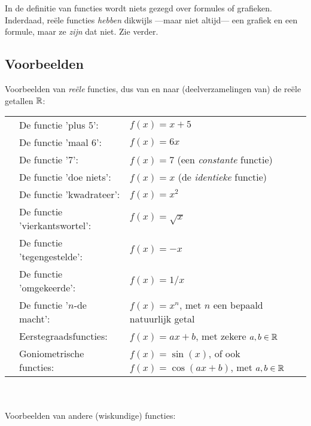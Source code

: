 \documentclass{ximera}
\begin{document}
 In de definitie van functies wordt niets gezegd over formules of grafieken. Inderdaad, reële functies \textit{hebben} dikwijls ---maar niet altijd--- een grafiek en een formule, maar ze \textit{zijn} dat niet. Zie verder.
 
 
\subsection{Voorbeelden}

Voorbeelden van \textit{reële} functies, dus van en naar (deelverzamelingen van) de reële getallen $\mathbb{R}$:
\\
\begin{tabular}[t]{l l l}
    & De functie 'plus $5$':       & $f(x) = x + 5$ \\
    & De functie 'maal 6':         & $f(x) = 6x$ \\
    & De functie '7':              & $f(x) = 7$  (een \textit{constante} functie) \\
    & De functie 'doe niets':      & $f(x) = x$  (de \textit{identieke} functie) \\
    & De functie 'kwadrateer':     & $f(x) = x^2$ \\
    & De functie 'vierkantswortel':& $f(x) = \sqrt{x}$ \\   
    & De functie 'tegengestelde':  & $f(x) = -x$ \\
    & De functie 'omgekeerde':     & $f(x) = 1/x$ \\
    & De functie '$n$-de macht':   & $f(x) = x^n$, met $n$ een bepaald %
     natuurlijk getal \\
    & Eerstegraadsfuncties:        & $f(x) = ax + b$, met zekere $a,b \in \mathbb{R}$  \\
    & Goniometrische functies:     & $f(x) = \sin(x)$, of ook $f(x)=\cos(ax+b)$, met $a,b \in \mathbb{R}$     \\
\end{tabular}
\\
\\
Voorbeelden van andere (wiskundige) functies:
\end{document}
